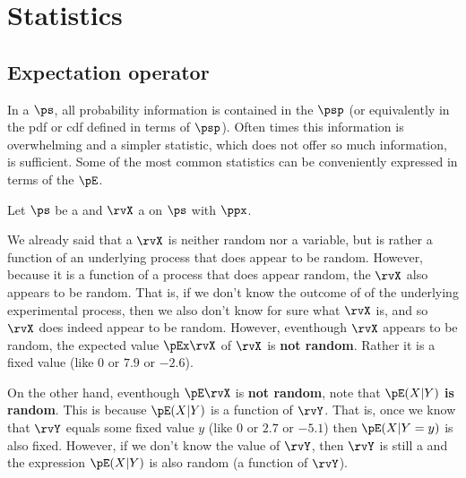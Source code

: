 \chapter{Statistics}
\label{chp:stats}
\section{Expectation operator}
In a  $\ps$, all probability information
is contained in the  $\psp$ (or equivalently in the pdf or cdf
defined in terms of $\psp$).
Often times this information is overwhelming and a simpler statistic,
which does not offer so much information, is sufficient.
Some of the most common statistics can be conveniently expressed in terms
of the  $\pE$.
\begin{definition}
\label{def:pE}
Let $\ps$ be a  and
$\rvX$ a  on $\ps$ with
 $\ppx$.
\end{definition}

We already said that a  $\rvX$ is neither random nor a variable,
but is rather a function of an underlying process that does appear to be random.
However, because it is a function of a process that does appear random,
the  $\rvX$ also appears to be random.
That is, if we don't know the outcome of of the underlying experimental
process, then we also don't know for sure what $\rvX$ is, and so $\rvX$ does
indeed appear to be random.
However, eventhough $\rvX$ appears to be random,
the expected value $\pEx\rvX$  of $\rvX$ is {\bf not random}.
Rather it is a fixed value (like $0$ or $7.9$ or $-2.6$).

On the other hand, eventhough $\pE\rvX$ is {\bf not random},
note that $\pE(X|Y)$ {\bf is random}.
This is because $\pE(X|Y)$ is a function of $\rvY$.
That is, once we know that $\rvY$ equals some fixed value $y$
(like $0$ or $2.7$ or $-5.1$) then $\pE(X|Y=y)$ is also fixed.
However, if we don't know the value of $\rvY$,
then $\rvY$ is still a  and the expression $\pE(X|Y)$
is also random (a function of  $\rvY$).

